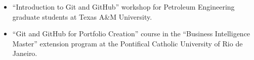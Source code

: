 
\begin{itemize}[leftmargin=*]
    \item ``Introduction to Git and GitHub'' workshop for Petroleum Engineering graduate students at Texas A\&M
    University.
    \item ``Git and GitHub for Portfolio Creation'' course in the ``Business Intelligence Master'' extension program at
    the Pontifical Catholic University of Rio de Janeiro.
\end{itemize}
